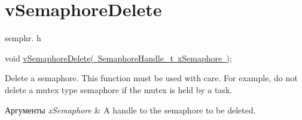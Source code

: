 \hypertarget{group__v_semaphore_delete}{}\section{v\+Semaphore\+Delete}
\label{group__v_semaphore_delete}
semphr. h 
\begin{DoxyPre}void \mbox{\hyperlink{semphr_8h_acd7d0eda0923d7caeeaaee9202c43eab}{vSemaphoreDelete( SemaphoreHandle\_t xSemaphore )}};\end{DoxyPre}


Delete a semaphore. This function must be used with care. For example, do not delete a mutex type semaphore if the mutex is held by a task.


\begin{DoxyParams}{Аргументы}
{\em x\+Semaphore} & A handle to the semaphore to be deleted. \\
\hline
\end{DoxyParams}
